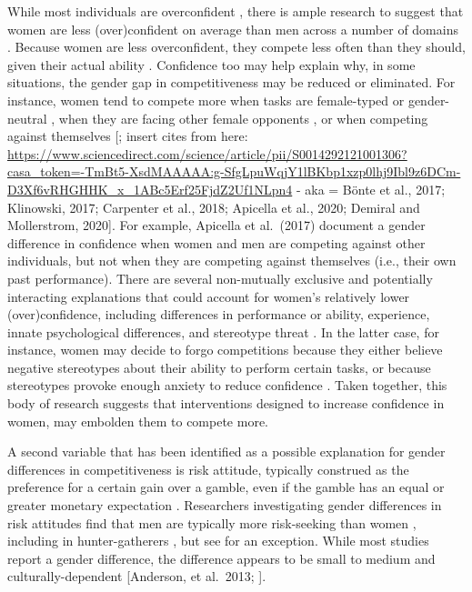\documentclass[a4paper, nobind]{templates/ociamthesis}
\begin{document}
While most individuals are overconfident \autocite{Alicke2013,Dunning2004b}, there is ample research to suggest that women are less (over)confident on average than men across a number of domains \autocite{Mobius2011,Niederle2011,Croson2009,Lundeberg1994,Niederle2007,Bertrand2010a,Beyer1990,Beyer1997,Jakobsson2013}. Because women are less overconfident, they compete less often than they should, given their actual ability \autocite{Niederle2007}. Confidence too may help explain why, in some situations, the gender gap in competitiveness may be reduced or eliminated. For instance, women tend to compete more when tasks are female-typed or gender-neutral \autocite{Iriberri2017,Boschini2014,Boschini2019,Apicella2015,Grosse2010,Gunther2010,Dreber2014,Dreber2011,Shurchkov2012}, when they are facing other female opponents \autocite{DattaGupta2013,Booth2012}, or when competing against themselves {[}\textcite{Apicella2017a}; insert cites from here: \url{https://www.sciencedirect.com/science/article/pii/S0014292121001306?casa_token=-TmBt5-XsdMAAAAA:g-SfgLpuWqjY1lBKbp1xzp0lhj9Ibl9z6DCm-D3Xf6vRHGHHK_x_1ABc5Erf25FjdZ2Uf1NLpn4} - aka = Bönte et al., 2017; Klinowski, 2017; Carpenter et al., 2018; Apicella et al., 2020; Demiral and Mollerstrom, 2020{]}. For example, Apicella et al.~(2017) document a gender difference in confidence when women and men are competing against other individuals, but not when they are competing against themselves (i.e., their own past performance). There are several non-mutually exclusive and potentially interacting explanations that could account for women's relatively lower (over)confidence, including differences in performance or ability, experience, innate psychological differences, and stereotype threat \autocite{Steele1997,Spencer1999,Spencer2016}. In the latter case, for instance, women may decide to forgo competitions because they either believe negative stereotypes about their ability to perform certain tasks, or because stereotypes provoke enough anxiety to reduce confidence \autocite{Gunther2010,Grosse2010,Iriberri2017,Shurchkov2012,Burow2017}. Taken together, this body of research suggests that interventions designed to increase confidence in women, may embolden them to compete more.

A second variable that has been identified as a possible explanation for gender differences in competitiveness is risk attitude, typically construed as the preference for a certain gain over a gamble, even if the gamble has an equal or greater monetary expectation \autocite{Kahneman1982}. Researchers investigating gender differences in risk attitudes find that men are typically more risk-seeking than women \autocite{Eckel2008,Charness2012,Croson2009,Bertrand2010a}, including in hunter-gatherers \autocite{Apicella2017}, but see \autocite{Harrison2007} for an exception. While most studies report a gender difference, the difference appears to be small to medium \autocite{Filippin2016} and culturally-dependent {[}Anderson, et al.~2013; \textcite{Gneezy2009}{]}.
\end{document}
